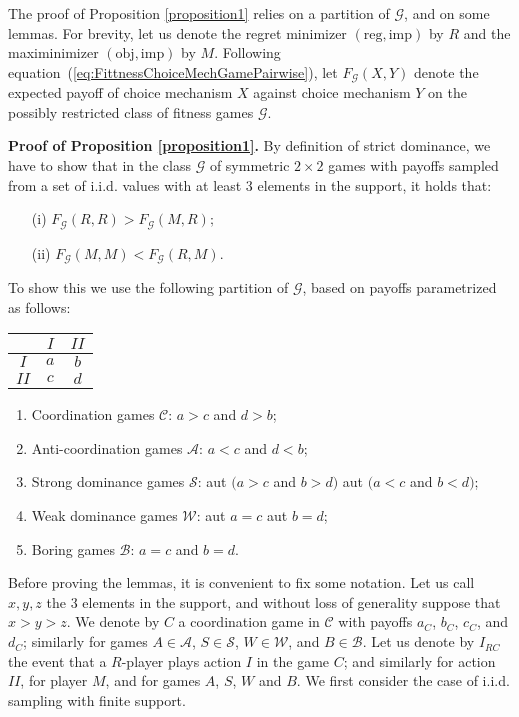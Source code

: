 \documentclass[fleqn,reqno,12pt]{article}
\theoremstyle{Satz}
\theoremstyle{Bsp}
\begin{document}
The proof of Proposition \ref{proposition1} relies on a partition of $\mathcal{G}$, and on some
lemmas. For brevity, let us denote the regret minimizer $(\text{reg}, \text{imp})$ by $R$ and
the maximinimizer $(\text{obj}, \text{imp})$ by $M$. Following
equation~(\ref{eq:FittnessChoiceMechGamePairwise}), let $F_{\mathcal{G}}(X,Y)$ denote the
expected payoff of choice mechanism $X$ against choice mechanism $Y$ on the possibly restricted
class of fitness games $\mathcal{G}$.

\vspace{.5cm}


\noindent \textbf{Proof of Proposition \ref{proposition1}.} By definition of strict dominance,
we have to show that in the class $\mathcal{G}$ of symmetric $2\times2$ games with payoffs
sampled from a set of i.i.d. values with at least 3 elements in the support, it holds that:
\begin{multicols}{2}
  \begin{itemize}
  \item[(i)] $F_{\mathcal{G}}(R,R)>F_{\mathcal{G}}(M,R);$
  \item[(ii)] $F_{\mathcal{G}}(M,M)<F_{\mathcal{G}}(R,M).$
  \end{itemize}
\end{multicols}

\noindent To show this we use the following partition of $\mathcal{G}$, based on payoffs parametrized as
follows:
\begin{center}
  \begin{tabular}{ccc}
    \toprule
    & $I$ & $II$ \\ \midrule
    $I$ & $a$ & $b$ \\
    $II$ & $c$ & $d$ \\ \bottomrule
  \end{tabular}
\end{center}
\begin{enumerate}
\item Coordination games $\mathcal{C}$: $a>c$ and $d>b$;
\item Anti-coordination games $\mathcal{A}$: $a<c$ and $d<b$;
\item Strong dominance games $\mathcal{S}$: aut $(a>c$ and $b>d)$
aut $(a<c$ and $b<d)$;
\item Weak dominance games $\mathcal{W}$: aut $a=c$ aut $b=d$;
\item Boring games $\mathcal{B}$: $a=c$ and $b=d$.
\end{enumerate}
Before proving the lemmas, it is convenient to fix some notation. Let us call $x,y,z$ the 3
elements in the support, and without loss of generality suppose that $ x > y > z $.  We denote
by $C$ a coordination game in $\mathcal{C}$ with payoffs $a_{C}$, $b_{C}$, $c_{C}$, and
$d_{C}$; similarly for games $A \in \mathcal{A}$, $S \in \mathcal{S}$, $W \in \mathcal{W}$, and
$B \in \mathcal{B}$.  Let us denote by $I_{RC}$ the event that a $R$-player plays action $I$ in
the game $C$; and similarly for action $II$, for player $M$, and for games $A$, $S$, $W$ and
$B$. We first consider the case of i.i.d. sampling with finite support.
\end{document}
